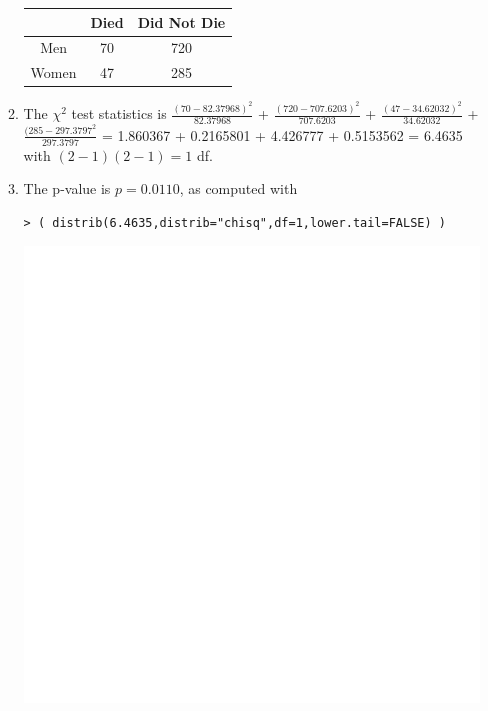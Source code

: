 \documentclass[10pt,openany]{book}\usepackage[]{graphicx}\usepackage[]{color}
\makeatletter
\newenvironment{kframe}{%
 \def\at@end@of@kframe{}%
 \ifinner\ifhmode%
  \def\at@end@of@kframe{\end{minipage}}%
  \begin{minipage}{\columnwidth}%
 \fi\fi%
 \def\FrameCommand##1{\hskip\@totalleftmargin \hskip-\fboxsep
 \colorbox{shadecolor}{##1}\hskip-\fboxsep
     \hskip-\linewidth \hskip-\@totalleftmargin \hskip\columnwidth}%
 \MakeFramed {\advance\hsize-\width
   \@totalleftmargin\z@ \linewidth\hsize
   \@setminipage}}%
 {\par\unskip\endMakeFramed%
 \at@end@of@kframe}
\newenvironment{knitrout}{}{} %
\makeatother
\begin{document}
\begin{itemize}
\begin{enumerate}
\begin{center}
\begin{tabular}{|c|c|c|}
             & Died & Did Not Die \\
            \hline
            Men & 70 & 720 \\
            \hline
            Women & 47 & 285 \\
            \hline\hline
          \end{tabular}
        \end{center}
      \item The $\chi^{2}$ test statistics is $\frac{(70-82.37968)^{2}}{82.37968}$ + $\frac{(720-707.6203)^{2}}{707.6203}$ + $\frac{(47-34.62032)^{2}}{34.62032}$ + $\frac{(285-297.3797^{2}}{297.3797}$ = 1.860367 + 0.2165801 + 4.426777 + 0.5153562 = 6.4635 with $(2-1)(2-1)=1$ df.
      \item The p-value is $p=0.0110$, as computed with
\begin{knitrout}
\color{fgcolor}\begin{kframe}
\begin{verbatim}
> ( distrib(6.4635,distrib="chisq",df=1,lower.tail=FALSE) )
\end{verbatim}


{\ttfamily\noindent\bfseries\color{errorcolor}{Error in plot.window(...): need finite 'ylim' values}}\end{kframe}

{\centering \includegraphics[width=.4\linewidth]{Figs/unnamed-chunk-447-1} 

}




\end{knitrout}
\end{enumerate}
\end{itemize}
\end{document}
